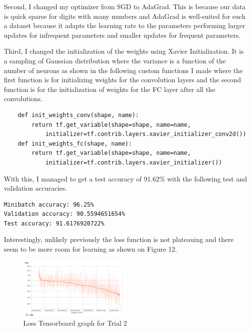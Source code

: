 \documentclass[twoside, column]{article}
\begin{document}
Second, I changed my optimizer from SGD to AdaGrad. This is because our data is quick sparse for digits with many numbers and AdaGrad is well-suited for such a dataset because it adapts the learning rate to the parameters performing larger updates for infrequent parameters and smaller updates for frequent parameters.

Third, I changed the initialization of the weights using Xavier Initialization. It is a sampling of Gaussian distribution where the variance is a function of the number of neurons as shown in the following custom functions I made where the first function is for initializing weights for the convolution layers and the second function is for the initialization of weights for the FC layer after all the convolutions.

\begin{verbatim}
    def init_weights_conv(shape, name):
        return tf.get_variable(shape=shape, name=name,
            initializer=tf.contrib.layers.xavier_initializer_conv2d())
    def init_weights_fc(shape, name):
        return tf.get_variable(shape=shape, name=name,
            initializer=tf.contrib.layers.xavier_initializer())
 \end{verbatim}
 
 With this, I managed to get a test accuracy of 91.62\% with the following test and validation accuracies.
\begin{verbatim}
Minibatch accuracy: 96.25%
Validation accuracy: 90.5594651654%
Test accuracy: 91.6176920722%
 \end{verbatim}
 
 Interestingly, unlikely previously the loss function is not plateauing and there seem to be more room for learning as shown on Figure 12.
 
\begin{figure}
\caption{Loss Tensorboard graph for Trial 2}
\centering
\includegraphics[width=0.5\textwidth]{trial_2_loss}
\end{figure}

\end{document}
